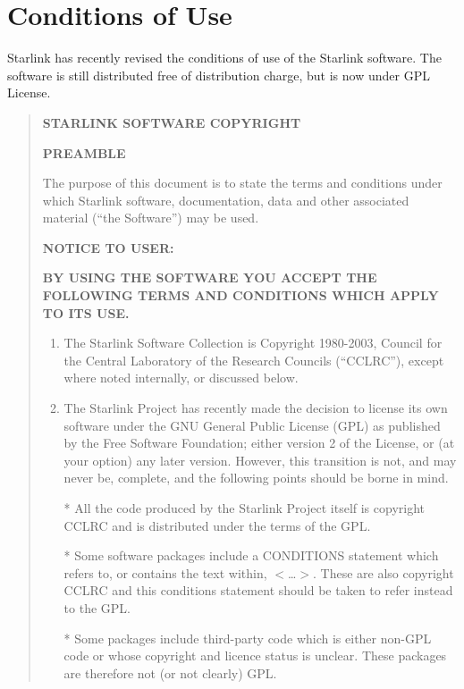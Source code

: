 \documentclass[twoside,11pt]{article}
\newcommand{\xlabel}[1]{}
\renewcommand{\_}{\texttt{\symbol{95}}}
\newcommand{\latexonlysmall}{\small}
\newcommand{\latexonlysmall}{}
\begin{document}
\section{\xlabel{conditions_of_use}Conditions of Use}
\label{conditions_of_use}

Starlink has recently revised the conditions of use of the Starlink 
software. The software is still distributed free of distribution charge,
but is now under GPL License.

\begin{quote}
\latexonlysmall
\begin{center}\textbf{STARLINK SOFTWARE COPYRIGHT}\end{center}
 
\textbf{PREAMBLE}

The purpose of this document is to state the terms and conditions
under which Starlink software, documentation, data and other associated
material (``the Software'') may be used.

\par 
\textbf{NOTICE TO USER:}
\par 
\textbf{BY USING THE SOFTWARE YOU ACCEPT THE FOLLOWING TERMS AND CONDITIONS
WHICH APPLY TO ITS USE.}
 
\begin{enumerate}

\item The Starlink Software Collection is Copyright 1980-2003, Council 
 for the Central Laboratory of the Research Councils (``CCLRC''), 
 except where noted internally, or discussed below.

\item The Starlink Project has recently made the decision to license its
 own software under the GNU General Public License (GPL) as published 
 by the Free Software Foundation; either version 2 of the License, 
 or (at your option) any later version. However, this transition is 
 not, and may never be, complete, and the following points should be 
 borne in mind.

  * All the code produced by the Starlink Project itself
    is copyright CCLRC and is distributed under the terms of the GPL.

  * Some software packages include a CONDITIONS statement which
    refers to, or contains the text within, $<$\ldots$>$.  
    These are also
    copyright CCLRC and this conditions statement should be taken
    to refer instead to the GPL.

  * Some packages include third-party code which is either non-GPL
    code or whose copyright and licence status is unclear.  These
    packages are therefore not (or not clearly) GPL.


\end{enumerate}
\end{quote}
\end{document}
